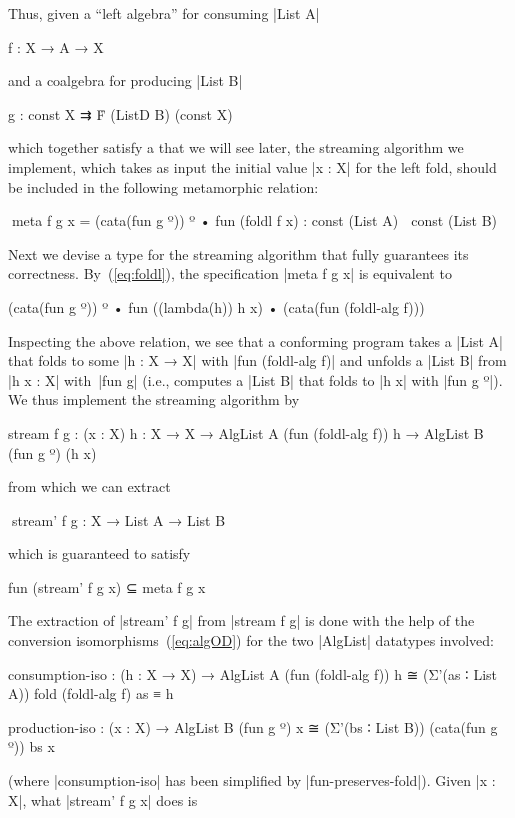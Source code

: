 Thus, given a ``left algebra'' for consuming |List A|
\begin{code}
f : X → A → X
\end{code}
and a coalgebra for producing |List B|
\begin{code}
g : const X ⇉ Ḟ (ListD B) (const X)
\end{code}
which together satisfy a  that we will see later, the streaming algorithm we implement, which takes as input the initial value |x : X| for the left fold, should be included in the following metamorphic relation:
\begin{code}
^^^meta f g x = (cata(fun g º)) º • fun (foldl f x) : const (List A) ↝ const (List B)
\end{code}

Next we devise a type for the streaming algorithm that fully guarantees its correctness.
 By~(\ref{eq:foldl}), the specification |meta f g x| is equivalent to
\begin{code}
(cata(fun g º)) º • fun ((lambda(h)) h x) • (cata(fun (foldl-alg f)))
\end{code}
Inspecting the above relation, we see that a conforming program takes a |List A| that folds to some |h : X → X| with |fun (foldl-alg f)| and unfolds a |List B| from |h x : X| with~|fun g| (i.e., computes a |List B| that folds to |h x| with |fun g º|).
We thus implement the streaming algorithm by
\begin{code}
stream f g :  (x : X) {h : X → X} →
              AlgList A (fun (foldl-alg f)) h → AlgList B (fun g º) (h x)
\end{code}
from which we can extract
\begin{code}
^^^stream' f g : X → List A → List B
\end{code}
which is guaranteed to satisfy
\begin{code}
fun (stream' f g x)  ⊆ meta f g x
\end{code}
The extraction of |stream' f g| from |stream f g| is done with the help of the conversion isomorphisms~(\ref{eq:algOD}) for the two |AlgList| datatypes involved:
\begin{code}
consumption-iso :
  (h : X → X) →
  AlgList A (fun (foldl-alg f)) h ≅ (Σ'(as ∶ List A)) fold (foldl-alg f) as ≡ h

production-iso :
  (x : X) → AlgList B (fun g º) x ≅ (Σ'(bs ∶ List B)) (cata(fun g º)) bs x
\end{code}
(where |consumption-iso| has been simplified by |fun-preserves-fold|).
Given |x : X|, what |stream' f g x| does is
